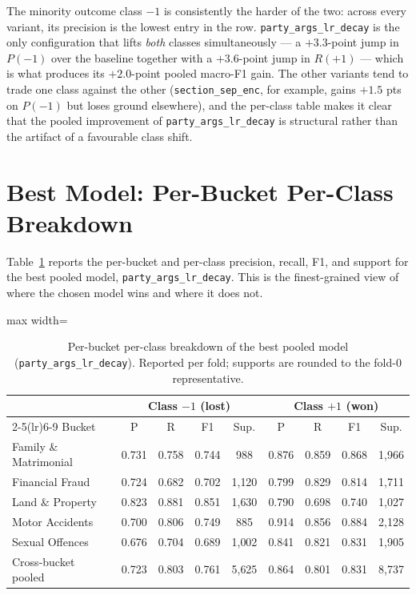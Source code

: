 The minority outcome class $-1$ is consistently the harder of the
two: across every variant, its precision is the lowest entry in the
row. \texttt{party\_args\_lr\_decay} is the only configuration that
lifts \emph{both} classes simultaneously --- a $+3.3$-point jump in
$P({-1})$ over the baseline together with a $+3.6$-point jump in
$R({+1})$ --- which is what produces its $+2.0$-point pooled
macro-F1 gain. The other variants tend to trade one class against
the other (\texttt{section\_sep\_enc}, for example, gains $+1.5$ pts
on $P({-1})$ but loses ground elsewhere), and the per-class table
makes it clear that the pooled improvement of
\texttt{party\_args\_lr\_decay} is structural rather than the
artifact of a favourable class shift.

\section{Best Model: Per-Bucket Per-Class Breakdown}
\label{sec:best_model_breakdown}

Table~\ref{tab:best_per_bucket_per_class} reports the per-bucket and
per-class precision, recall, F1, and support for the best pooled
model, \texttt{party\_args\_lr\_decay}. This is the finest-grained
view of where the chosen model wins and where it does not.

\begin{table}[H]
  \centering
  \scriptsize
  \setlength{\tabcolsep}{5pt}
  \begin{adjustbox}{max width=\textwidth}
  \begin{tabular}{lcccccccc}
    \toprule
    & \multicolumn{4}{c}{Class $-1$ (lost)} & \multicolumn{4}{c}{Class $+1$ (won)} \\
    \cmidrule(lr){2-5}\cmidrule(lr){6-9}
    Bucket & P & R & F1 & Sup. & P & R & F1 & Sup. \\
    \midrule
    Family \& Matrimonial & 0.731 & 0.758 & 0.744 & 988    & 0.876 & 0.859 & 0.868 & 1{,}966 \\
    Financial Fraud       & 0.724 & 0.682 & 0.702 & 1{,}120 & 0.799 & 0.829 & 0.814 & 1{,}711 \\
    Land \& Property      & 0.823 & 0.881 & 0.851 & 1{,}630 & 0.790 & 0.698 & 0.740 & 1{,}027 \\
    Motor Accidents       & 0.700 & 0.806 & 0.749 & 885    & 0.914 & 0.856 & 0.884 & 2{,}128 \\
    Sexual Offences       & 0.676 & 0.704 & 0.689 & 1{,}002 & 0.841 & 0.821 & 0.831 & 1{,}905 \\
    \midrule
    Cross-bucket pooled   & 0.723 & 0.803 & 0.761 & 5{,}625 & 0.864 & 0.801 & 0.831 & 8{,}737 \\
    \bottomrule
  \end{tabular}
  \end{adjustbox}
  \caption{Per-bucket per-class breakdown of the best pooled model
  (\texttt{party\_args\_lr\_decay}). Reported per fold; supports are
  rounded to the fold-0 representative.}
  \label{tab:best_per_bucket_per_class}
\end{table}

